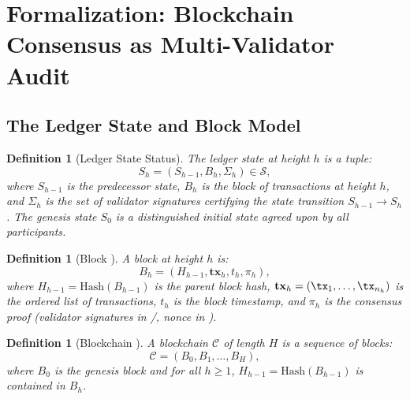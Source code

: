 \documentclass[11pt,a4paper]{article}
\newtheorem{definition}[theorem]{Definition}
\theoremstyle{definition}
\newcommand{\stateSpace}{\mathcal{S}}
\newcommand{\PoW}{\mathrm{PoW}}
\newcommand{\PoS}{\mathrm{PoS}}
\newcommand{\PBFT}{\mathrm{PBFT}}
\begin{document}
\section{Formalization: Blockchain Consensus as Multi-Validator Audit}
\label{sec:formalization}
\subsection{The Ledger State and Block Model}
\begin{definition}[Ledger State Status]
\label{def:ledger_state}
The ledger state at height $h$ is a tuple:
\begin{equation}
    S_h = (S_{h-1}, B_h, \Sigma_h) \in \stateSpace,
    \label{eq:ledger_state}
\end{equation}
where $S_{h-1}$ is the predecessor state, $B_h$ is the block of transactions at height $h$, and $\Sigma_h$ is the set of validator signatures certifying the state transition $S_{h-1} \to S_h$. The genesis state $S_0$ is a distinguished initial state agreed upon by all participants.
\end{definition}
\begin{definition}[Block ]
\label{def:block}
A block at height $h$ is:
\begin{equation}
    B_h = (H_{h-1}, \mathbf{tx}_h, t_h, \pi_h),
    \label{eq:block}
\end{equation}
where $H_{h-1} = \mathrm{Hash}(B_{h-1})$ is the parent block hash, $\mathbf{tx}_h = (\tx_1, \ldots, \tx_{n_h})$ is the ordered list of transactions, $t_h$ is the block timestamp, and $\pi_h$ is the consensus proof (validator signatures in \PoS{}/\PBFT{}, nonce in \PoW{}).
\end{definition}
\begin{definition}[Blockchain ]
\label{def:blockchain}
A blockchain $\mathcal{C}$ of length $H$ is a sequence of blocks:
\begin{equation}
    \mathcal{C} = (B_0, B_1, \ldots, B_H),
    \label{eq:blockchain}
\end{equation}
where $B_0$ is the genesis block and for all $h \geq 1$, $H_{h-1} = \mathrm{Hash}(B_{h-1})$ is contained in $B_h$.
\end{definition}
\end{document}
